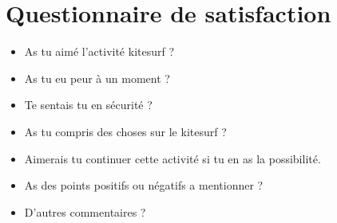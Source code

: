 \documentclass[12pt,a4paper]{report}
\begin{document}






\appendix
\appendixpage
\addappheadtotoc
\chapter{Questionnaire de satisfaction\label{questionnaire}}
\begin{itemize}
\item As tu aimé l'activité kitesurf ?
\item As tu eu peur à un moment ?
\item Te sentais tu en sécurité ?
\item As tu compris des choses sur le kitesurf ?
\item Aimerais tu continuer cette activité si tu en as la possibilité.
\item As des points positifs ou négatifs a mentionner ?
\item D'autres commentaires ?

\end{itemize}
\end{document}
